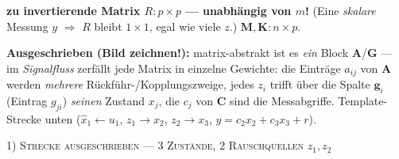 \textbf{zu invertierende Matrix $R{:}p{\times}p$ — unabhängig von $m$!}\;
(Eine \emph{skalare} Messung $y$ $\Rightarrow$ $R$ bleibt $1{\times}1$, egal wie viele $z$.)\;
$\mathbf M,\mathbf K{:}n{\times}p$.
\par\vspace{0.15em}
\par\vspace{0.15em}\noindent
\textbf{Ausgeschrieben (Bild zeichnen!):} matrix-abstrakt ist es \emph{ein} Block $\mathbf A$/$\mathbf G$
— im \emph{Signalfluss} zerfällt jede Matrix in einzelne Gewichte: die Einträge $a_{ij}$ von $\mathbf A$
werden \emph{mehrere} Rückführ-/Kopplungszweige, jedes $z_i$ trifft über die Spalte $\mathbf g_i$
(Eintrag $g_{ji}$) \emph{seinen} Zustand $x_j$, die $c_j$ von $\mathbf C$ sind die Messabgriffe.
Template-Strecke unten ($\hat x_1{\leftarrow}u_1$, $z_1{\to}x_2$, $z_2{\to}x_3$, $y{=}c_2x_2{+}c_3x_3{+}r$).
\par\vspace{0.3em}\centering
{\scriptsize\scshape\color{gray!65!black} 1) Strecke ausgeschrieben — 3 Zustände, 2 Rauschquellen $z_1,z_2$}\par\vspace{0.05em}
